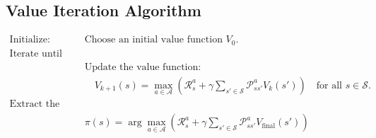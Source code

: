 \documentclass[11pt]{article}
\begin{document}
    \subsection{Value Iteration Algorithm}\label{value-iteration-algorithm}

\[
\begin{align*}
\text{Initialize:} & \quad \text{Choose an initial value function } V_0. \\
\text{Iterate until convergence:} & \\
& \quad \text{Update the value function:} \\
& \quad \quad V_{k+1}(s) = \max_{a \in \mathcal{A}} \left( \mathcal{R}_s^a + \gamma \sum_{s' \in \mathcal{S}} \mathcal{P}_{ss'}^a V_k(s') \right) \quad \text{for all } s \in \mathcal{S}. \\
\text{Extract the policy:} & \\
& \quad \pi(s) = \arg\max_{a \in \mathcal{A}} \left( \mathcal{R}_s^a + \gamma \sum_{s' \in \mathcal{S}} \mathcal{P}_{ss'}^a V_{\text{final}}(s') \right)
\end{align*}
\]
\end{document}
